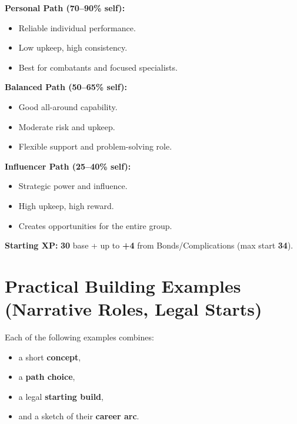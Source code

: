 \begin{tcolorbox}[colback=green!5!white,colframe=green!75!black,title=XP Path Quick Reference,fonttitle=\bfseries]
\textbf{Personal Path (70--90\% self):}
\begin{itemize}
\item Reliable individual performance.
\item Low upkeep, high consistency.
\item Best for combatants and focused specialists.
\end{itemize}

\textbf{Balanced Path (50--65\% self):}
\begin{itemize}
\item Good all-around capability.
\item Moderate risk and upkeep.
\item Flexible support and problem-solving role.
\end{itemize}

\textbf{Influencer Path (25--40\% self):}
\begin{itemize}
\item Strategic power and influence.
\item High upkeep, high reward.
\item Creates opportunities for the entire group.
\end{itemize}

\textbf{Starting XP:} \textbf{30} base \;+\; up to \textbf{+4} from Bonds/Complications (max start \textbf{34}).
\end{tcolorbox}


\section{Practical Building Examples (Narrative Roles, Legal Starts)}
\label{sec:xp-examples}

Each of the following examples combines:
\begin{itemize}
  \item a short \textbf{concept},
  \item a \textbf{path choice},
  \item a legal \textbf{starting build},
  \item and a sketch of their \textbf{career arc}.
\end{itemize}

